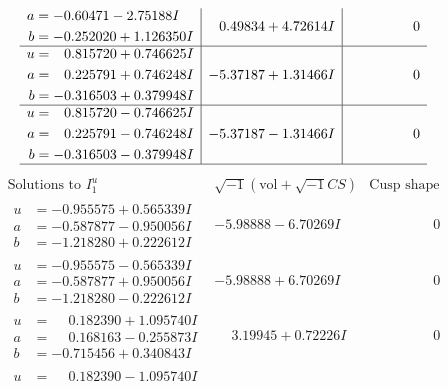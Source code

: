 \documentclass[1p]{elsarticle_modified}
\theoremstyle{definition}
\newcommand{\I}{\sqrt{-1}}
\begin{document}
$$\begin{array}{c|c|c}
\begin{aligned}
a &= -0.60471 - 2.75188 I \\
b &= -0.252020 + 1.126350 I\end{aligned}
 & \phantom{-}0.49834 + 4.72614 I & \phantom{-0.000000 } 0 \\ \hline\begin{aligned}
u &= \phantom{-}0.815720 + 0.746625 I \\
a &= \phantom{-}0.225791 + 0.746248 I \\
b &= -0.316503 + 0.379948 I\end{aligned}
 & -5.37187 + 1.31466 I & \phantom{-0.000000 } 0 \\ \hline\begin{aligned}
u &= \phantom{-}0.815720 - 0.746625 I \\
a &= \phantom{-}0.225791 - 0.746248 I \\
b &= -0.316503 - 0.379948 I\end{aligned}
 & -5.37187 - 1.31466 I & \phantom{-0.000000 } 0\\
 \hline 
 \end{array}$$\newpage$$\begin{array}{c|c|c}  
\text{Solutions to }I^u_{1}& \I (\text{vol} + \sqrt{-1}CS) & \text{Cusp shape}\\
 \hline 
\begin{aligned}
u &= -0.955575 + 0.565339 I \\
a &= -0.587877 - 0.950056 I \\
b &= -1.218280 + 0.222612 I\end{aligned}
 & -5.98888 - 6.70269 I & \phantom{-0.000000 } 0 \\ \hline\begin{aligned}
u &= -0.955575 - 0.565339 I \\
a &= -0.587877 + 0.950056 I \\
b &= -1.218280 - 0.222612 I\end{aligned}
 & -5.98888 + 6.70269 I & \phantom{-0.000000 } 0 \\ \hline\begin{aligned}
u &= \phantom{-}0.182390 + 1.095740 I \\
a &= \phantom{-}0.168163 - 0.255873 I \\
b &= -0.715456 + 0.340843 I\end{aligned}
 & \phantom{-}3.19945 + 0.72226 I & \phantom{-0.000000 } 0 \\ \hline\begin{aligned}
u &= \phantom{-}0.182390 - 1.095740 I \\

\end{aligned}
\end{array}$$
\end{document}
